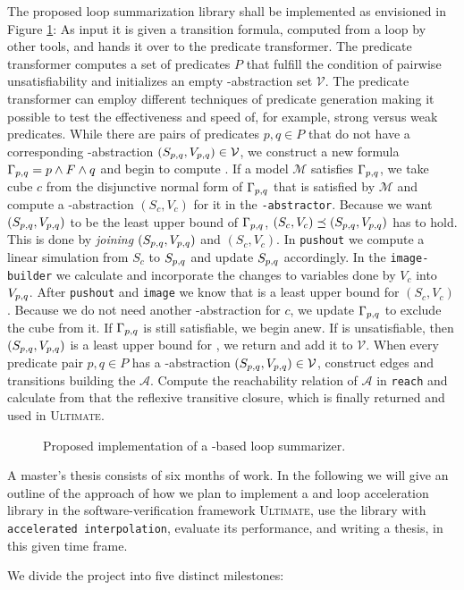 
The proposed \qvasrs loop summarization library shall be implemented as envisioned in Figure \ref{fig}: As input it is given a transition formula, computed from a loop by other tools, and hands it over to the predicate transformer. The predicate transformer computes a set of predicates $P$ that fulfill the condition of pairwise unsatisfiability and initializes an empty \qvasr-abstraction set $\mathcal{V}$. The predicate transformer can employ different techniques of predicate generation making it possible to test the effectiveness and speed of, for example, strong versus weak predicates. While there are pairs of predicates $p, q \in P$ that do not have a corresponding \qvasr-abstraction $(S_{p, q}, V_{p, q}) \in \mathcal{V}$, we construct a new formula $\Gamma_{p, q} = p \land F \land q$ and begin to compute \pqvasr. If a model $\mathcal{M}$ satisfies $\Gamma_{p, q}$, we take cube $c$ from the disjunctive normal form of $\Gamma_{p, q}$ that is satisfied by $\mathcal{M}$ and compute a \qvasr-abstraction $(S_c, V_c)$ for it in the \texttt{\qvasr-abstractor}. Because we want $(S_{p, q}, V_{p, q})$ to be the least upper bound of $\Gamma_{p, q}$, $(S_c, V_c) \preceq (S_{p, q}, V_{p, q})$ has to hold. This is done by \textsl{joining} $(S_{p, q}, V_{p, q})$ and $(S_c, V_c)$. In \texttt{pushout} we compute a linear simulation from $S_c$ to $S_{p, q}$ and update $S_{p, q}$ accordingly. In the \texttt{image-builder} we calculate and incorporate the changes to variables done by $V_c$ into $V_{p, q}$. After \texttt{pushout} and \texttt{image} we know that \pqvasr is a least upper bound for $(S_c, V_c)$. Because we do not need another \qvasr-abstraction for $c$, we update $\Gamma_{p, q}$ to exclude the cube from it. If $\Gamma_{p, q}$ is still satisfiable, we begin anew.
If \pqformula is unsatisfiable, then $(S_{p, q}, V_{p, q})$ is a least upper bound for \pqformula, we return and add it to $\mathcal{V}$. When every predicate pair $p, q \in P$ has a \qvasr-abstraction $(S_{p, q}, V_{p, q}) \in \mathcal{V}$, construct edges and transitions building the \qvasrs $\mathcal{A}$. Compute the reachability relation of $\mathcal{A}$ in \texttt{reach} and calculate from that the reflexive transitive closure, which is finally returned and used in \textsc{Ultimate}.
\begin{figure}[H]
    
    \caption{Proposed implementation of a \qvasrs-based loop summarizer.}
    \label{fig}
\end{figure}

A master's thesis consists of six months of work. In the following we will give an outline of the approach of how we plan to implement a \qvasr and \qvasrs loop acceleration library in the software-verification framework \textsc{Ultimate}, use the library with \texttt{accelerated interpolation}, evaluate its performance, and writing a thesis, in this given time frame. \\ \par
We divide the project into five distinct milestones:


